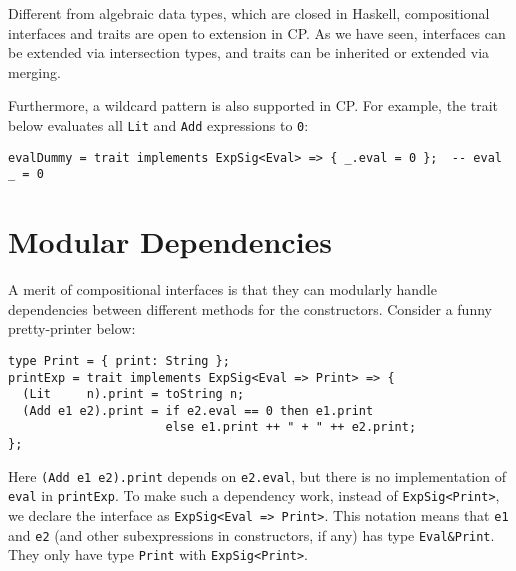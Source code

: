 \begin{tipblock}
Different from algebraic data types, which are closed in Haskell, compositional
interfaces and traits are open to extension in CP. As we have seen, interfaces
can be extended via intersection types, and traits can be inherited or extended
via merging.
\end{tipblock}

\noindent
Furthermore, a wildcard pattern is also supported in CP. For example, the trait
below evaluates all \lstinline{Lit} and \lstinline{Add} expressions to \lstinline{0}:
\begin{lstlisting}
evalDummy = trait implements ExpSig<Eval> => { _.eval = 0 };  -- eval _ = 0
\end{lstlisting}

\section{Modular Dependencies}

A merit of compositional interfaces is that they can modularly handle
dependencies between different methods for the constructors. Consider a funny
pretty-printer below:
\begin{lstlisting}
type Print = { print: String };
printExp = trait implements ExpSig<Eval => Print> => {
  (Lit     n).print = toString n;
  (Add e1 e2).print = if e2.eval == 0 then e1.print
                      else e1.print ++ " + " ++ e2.print;
};
\end{lstlisting}
Here \lstinline{(Add e1 e2).print} depends on \lstinline{e2.eval}, but there is
no implementation of \lstinline{eval} in \lstinline{printExp}. To make such a
dependency work, instead of \lstinline{ExpSig<Print>}, we declare the interface
as \lstinline{ExpSig<Eval => Print>}. This notation means that \lstinline{e1}
and \lstinline{e2} (and other subexpressions in constructors, if any) has type
\lstinline{Eval&Print}. They only have type \lstinline{Print} with
\lstinline{ExpSig<Print>}.

